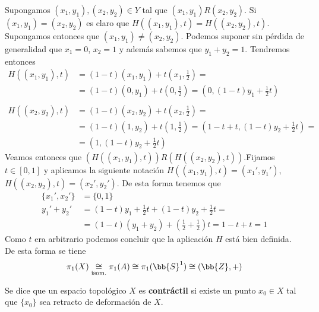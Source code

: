 \begin{ejemplo}
\begin{enumerate}
        Supongamos $(x_1, y_1),(x_2,y_2)\in Y$ tal que $(x_1,y_1)R(x_2,y_2)$. Si $(x_1,y_1)=(x_2,y_2)$ es claro que $H((x_1,y_1), t) = H((x_2,y_2), t)$. Supongamos entonces que $(x_1,y_1)\neq(x_2,y_2)$. Podemos suponer sin pérdida de generalidad que $x_1=0$, $x_2=1$ y además sabemos que $y_1+y_2 = 1$. Tendremos entonces
        \begin{align*}
            H((x_1,y_1), t) &= (1-t)(x_1,y_1)+t\left(x_1, \frac{1}{2}\right) = \\
            &= (1-t)(0,y_1)+t\left(0, \frac{1}{2}\right) = \left(0,(1-t) y_1 + \frac{1}{2}t\right)\\\\
            H((x_2,y_2), t) &= (1-t)(x_2,y_2)+t\left(x_2, \frac{1}{2}\right) = \\
            &= (1-t)(1,y_2)+t\left(1, \frac{1}{2}\right) = \left(1-t+t, (1-t)y_2 + \frac{1}{2}t\right) =\\
            &= \left(1, (1-t)y_2 + \frac{1}{2}t\right)
        \end{align*}
        Veamos entonces que $(H((x_1,y_1), t))R(H((x_2,y_2), t))$.Fijamos $t\in [0,1]$ y aplicamos la siguiente notación $H((x_1,y_1), t) = (x_1', y_1')$, $H((x_2,y_2), t) = (x_2', y_2')$. De esta forma tenemos que
        \begin{align*}
            \{x_1', x_2'\} &= \{0,1\}\\
            y_1'+y_2' &= (1-t) y_1 + \frac{1}{2}t + (1-t)y_2 + \frac{1}{2}t =\\
            &= (1-t)(y_1+y_2) + \left(\frac{1}{2} + \frac{1}{2}\right)t = 1-t + t = 1
        \end{align*}
        Como $t$ era arbitrario podemos concluir que la aplicación $H$ está bien definida. De esta forma se tiene
        \begin{gather*}
            \pi_1(X) \underset{\text{isom.}}{\cong} \pi_1(A) \cong \pi_1(\bb{S}^1)\cong (\bb{Z},+)
        \end{gather*}

    \end{enumerate}
\end{ejemplo}

\begin{definicion}
    Se dice que un espacio topológico $X$ es \textbf{contráctil} si existe un punto $x_0\in X$ tal que $\{x_0\}$ sea retracto de deformación de $X$.
\end{definicion}

